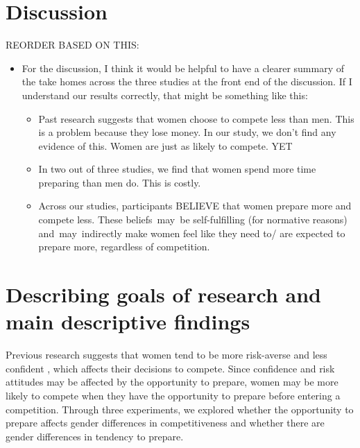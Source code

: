 \documentclass[a4paper,nobind]{templates/ociamthesis}
\providecommand{\tightlist}{%
  \setlength{\itemsep}{0pt}\setlength{\parskip}{0pt}}
\begin{document}
\hypertarget{discussion-3}{%
\section{Discussion}\label{discussion-3}}

REORDER BASED ON THIS:

\begin{itemize}
\tightlist
\item
  For the discussion, I think it would be helpful to have a clearer
  summary of the take homes across the three studies at the front end of
  the discussion. If I understand our results correctly, that might be
  something like this:

  \begin{itemize}
  \tightlist
  \item
    Past research suggests that women choose to compete less than men.
    This is a problem because they lose money. In our study, we don't find
    any evidence of this. Women are just as likely to compete. YET
  \item
    In two out of three studies, we find that women spend more time preparing than men do. This is costly.
  \item
    Across our studies, participants BELIEVE that women prepare more and compete less. These beliefs~may~be self-fulfilling (for normative reasons) and~may~indirectly make women feel like they need to/ are expected to prepare more, regardless of competition.
  \end{itemize}
\end{itemize}

\hypertarget{describing-goals-of-research-and-main-descriptive-findings}{%
\section{Describing goals of research and main descriptive findings}\label{describing-goals-of-research-and-main-descriptive-findings}}

Previous research suggests that women tend to be more risk-averse \autocite{Croson2009,Dohmen2011b,Eckel2008,Bertrand2010a} and less confident \autocite{Bertrand2010,Lundeberg1994,Mobius2011,Barber2001,Croson2009}, which affects their decisions to compete. Since confidence and risk attitudes may be affected by the opportunity to prepare, women may be more likely to compete when they have the opportunity to prepare before entering a competition. Through three experiments, we explored whether the opportunity to prepare affects gender differences in competitiveness and whether there are gender differences in tendency to prepare.
\end{document}
